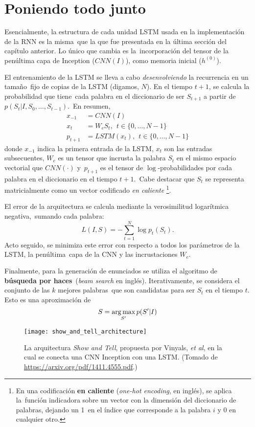\section{Poniendo todo junto}

\noindent
Esencialmente, la estructura de cada unidad LSTM usada en la implementación de la RNN es la misma\
que la que fue presentada en la última sección del capítulo anterior. Lo único que cambia es la\
incorporación del tensor de la penúltima capa de Inception ($CNN(I)$), como memoria inicial ($h^{(0)}$).\par
El entrenamiento de la LSTM se lleva a cabo \emph{desenvolviendo} la recurrencia en un tamaño\
fijo de copias de la LSTM (digamos, $N$). En el tiempo $t+1$, se calcula la probabilidad que tiene\
cada palabra en el diccionario de ser $S_{t+1}$ a partir de $p(S_t|I,S_0,\ldots,S_{t-1})$.\
En resumen,
\begin{align}
  x_{-1} &= CNN(I)\\
  x_t &= W_eS_t,\ \ t \in \{0,\ldots,N-1\}\\
  p_{t+1} &= LSTM(x_t),\ \ t \in \{0,\ldots,N-1\}
\end{align}
donde $x_{-1}$ indica la primera entrada de la LSTM, $x_t$ son las entradas subsecuentes,
$W_e$ es un tensor que incrusta la palabra $S_t$ en el mismo espacio vectorial que $CNN(\cdot)$ y\
$p_{t+1}$ es el tensor de $\log$-probabilidades por cada palabra en el diccionario en el tiempo $t+1$.\
Cabe destacar que $S_t$ se representa matricialmente como un vector codificado \emph{en caliente}
\footnote{
  En una codificación \textbf{en caliente} (\emph{one-hot encoding}, en inglés), se aplica la\
  función indicadora sobre un vector con la dimensión del diccionario de palabras, dejando un 1\
  en el índice que corresponde a la palabra $i$ y 0 en cualquier otro.
}.\par
El error de la arquitectura se calcula mediante la verosimilitud logarítmica negativa,\
sumando cada palabra:
\begin{equation}
  L(I, S) = - \sum_{t=1} ^N \log p_t(S_t). 
\end{equation}
Acto seguido, se minimiza este error con respecto a todos los parámetros de la LSTM, la penúltima\
capa de la CNN y las incrustaciones $W_e$.\par
Finalmente, para la generación de enunciados se utiliza el algoritmo de \textbf{búsqueda por haces}\
(\emph{beam search} en inglés). Iterativamente, se considera el conjunto de las $k$ mejores palabras\
que son candidatas para ser $S_t$ en el tiempo $t$. Esto es una aproximación de
\begin{equation}
  S = \operatorname*{arg\,max}_{S'} p(S'|I)
\end{equation}

\begin{figure}[H]
  \centering
  \texttt{[image: show\_and\_tell\_architecture]}
  \caption{La arquitectura \emph{Show and Tell}, propuesta por Vinyals, \emph{et al},\cite{DBLP:journals/corr/VinyalsTBE14}
    en la cual se conecta una CNN Inception con una LSTM.
    (Tomado de \url{https://arxiv.org/pdf/1411.4555.pdf}.)}
  \label{show_and_tell_architecture}
\end{figure}
